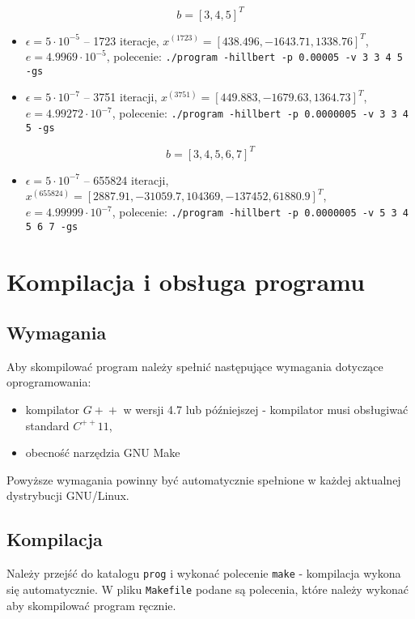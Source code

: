 \documentclass[a4paper,11pt]{article}
\begin{document}
    $$ b = [3, 4, 5]^T $$
    \begin{itemize}
      \item $ \epsilon = 5 \cdot 10^{-5} $ -- 1723 iteracje, $ x^{(1723)} = [438.496, -1643.71, 1338.76]^T $, $ e = 4.9969 \cdot 10^{-5} $,
            polecenie: \texttt{./program -hillbert -p 0.00005 -v 3 3 4 5 -gs}
      \item $ \epsilon = 5 \cdot 10^{-7} $ -- 3751 iteracji, $ x^{(3751)} = [449.883, -1679.63, 1364.73]^T $, $ e = 4.99272 \cdot 10^{-7} $,
            polecenie: \texttt{./program -hillbert -p 0.0000005 -v 3 3 4 5 -gs}
    \end{itemize}
    
     $$ b = [3, 4, 5, 6, 7]^T $$
    \begin{itemize}
      \item $ \epsilon = 5 \cdot 10^{-7} $ -- 655824 iteracji, $ x^{(655824)} = [2887.91, -31059.7, 104369, -137452, 61880.9]^T $, $ e = 4.99999 \cdot 10^{-7} $,
            polecenie: \texttt{./program -hillbert -p 0.0000005 -v 5 3 4 5 6 7 -gs}
    \end{itemize}
    
    

\section{Kompilacja i obsługa programu}
    \subsection{Wymagania}
    Aby skompilować program należy spełnić następujące wymagania dotyczące oprogramowania:
    \begin{itemize}
      \item kompilator $ G\!+\!+ $ w wersji 4.7 lub późniejszej - kompilator musi obsługiwać standard $ C^{++}11 $,
      \item obecność narzędzia GNU Make
    \end{itemize}
    Powyższe wymagania powinny być automatycznie spełnione w każdej aktualnej dystrybucji GNU/Linux.
    
    \subsection{Kompilacja}
    Należy przejść do katalogu \texttt{prog} i wykonać polecenie \texttt{make} - kompilacja wykona się automatycznie. W pliku \texttt{Makefile} podane są polecenia, które należy wykonać aby skompilować program ręcznie.
    
\end{document}

